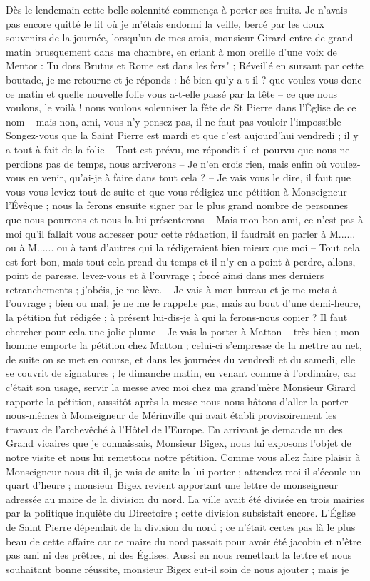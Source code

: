 \documentclass[11pt,a4paper]{report}
\begin{document}
Dès le lendemain cette belle solennité commença à porter ses fruits. Je n'avais pas encore quitté le lit où je m'étais endormi la veille, bercé par les doux souvenirs de la journée, lorsqu'un de mes amis, monsieur Girard entre de grand matin brusquement dans ma chambre, en criant à mon oreille d'une voix de Mentor : Tu dors Brutus et Rome est dans les fers" ; Réveillé en sursaut par cette boutade, je me retourne et je réponds : hé bien qu'y a-t-il ? que voulez-vous donc ce matin et quelle nouvelle folie vous a-t-elle passé par la tête -- ce que nous voulons, le voilà ! nous voulons solenniser la fête de St Pierre dans l'Église de ce nom -- mais non, ami, vous n'y pensez pas, il ne faut pas vouloir l'impossible Songez-vous que la Saint Pierre est mardi et que c'est aujourd'hui vendredi ; il y a tout à fait de la folie -- Tout est prévu, me répondit-il et pourvu que nous ne perdions pas de temps, nous arriverons -- Je n'en crois rien, mais enfin où voulez-vous en venir, qu'ai-je à faire dans tout cela ? -- Je vais vous le dire, il faut que vous vous leviez tout de suite et que vous rédigiez une pétition à Monseigneur l'Évêque ; nous la ferons ensuite signer par le plus grand nombre de personnes que nous pourrons et nous la lui présenterons -- Mais mon bon ami, ce n'est pas à moi qu'il fallait vous adresser pour cette rédaction, il faudrait en parler à M...... ou à M...... ou à tant d'autres qui la rédigeraient bien mieux que moi -- Tout cela est fort bon, mais tout cela prend du temps et il n'y en a point à perdre, allons, point de paresse, levez-vous et à l'ouvrage ; forcé ainsi dans mes derniers retranchements ; j'obéis, je me lève. -- Je vais à mon bureau et je me mets à l'ouvrage ; bien ou mal, je ne me le rappelle pas, mais au bout d'une demi-heure, la pétition fut rédigée ; à présent lui-dis-je à qui la ferons-nous copier ? Il faut chercher pour cela une jolie plume -- Je vais la porter à Matton -- très bien ; mon homme emporte la pétition chez Matton ; celui-ci s'empresse de la mettre au net, de suite on se met en course, et dans les journées du vendredi et du samedi, elle se couvrit de signatures ; le dimanche matin, en venant comme à l'ordinaire, car c'était son usage, servir la messe avec moi chez ma grand'mère Monsieur Girard rapporte la pétition, aussitôt après la messe nous nous hâtons d'aller la porter nous-mêmes à Monseigneur de Mérinville qui avait établi provisoirement les travaux de l'archevêché à l'Hôtel de l'Europe. En arrivant je demande un des Grand vicaires que je connaissais, Monsieur Bigex, nous lui exposons l'objet de notre visite et nous lui remettons notre pétition. Comme vous allez faire plaisir à Monseigneur nous dit-il, je vais de suite la lui porter ; attendez moi il s'écoule un quart d'heure ; monsieur Bigex revient apportant une lettre de monseigneur adressée au maire de la division du nord. La ville avait été divisée en trois mairies par la politique inquiète du Directoire ; cette division subsistait encore. L'Église de Saint Pierre dépendait de la division du nord ; ce n'était certes pas là le plus beau de cette affaire car ce maire du nord passait pour avoir été jacobin et n'être pas ami ni des prêtres, ni des Églises. Aussi en nous remettant la lettre et nous souhaitant bonne réussite, monsieur Bigex eut-il soin de nous ajouter ; mais je 
\end{document}
